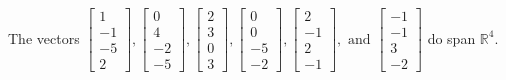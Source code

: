 \begin{exercise}
\begin{exerciseStatement}
  \end{exerciseStatement}
  \begin{exerciseAnswer}
   The vectors \(\left[\begin{array}{r}
1 \\
-1 \\
-5 \\
2
\end{array}\right] , \left[\begin{array}{r}
0 \\
4 \\
-2 \\
-5
\end{array}\right] , \left[\begin{array}{r}
2 \\
3 \\
0 \\
3
\end{array}\right] , \left[\begin{array}{r}
0 \\
0 \\
-5 \\
-2
\end{array}\right] , \left[\begin{array}{r}
2 \\
-1 \\
2 \\
-1
\end{array}\right] , \text{ and } \left[\begin{array}{r}
-1 \\
-1 \\
3 \\
-2
\end{array}\right]\) 
  	 do  
	span \(\mathbb{R}^4\).
  


  \end{exerciseAnswer}
\end{exercise}